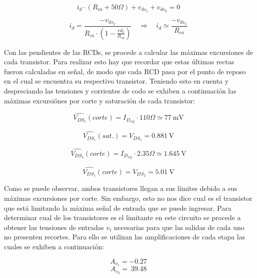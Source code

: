 \documentclass[a4paper,10pt]{article}
\begin{document}
				\begin{equation}
					i_d \cdot (R_{ca} + 50 \Omega) + v_{ds_1} + v_{ds_2} = 0  \label{eeq003}
				\end{equation}

				\begin{equation}
					i_d = \frac{- v_{ds_2}}{R_{ca} \cdot(1 - \frac{r{d_2}}{R_{ca}})} \quad \Rightarrow \quad i_d \simeq \frac{- v_{ds_2}}{R_{ca}}	\label{eeq004}
				\end{equation}	

				Con las pendientes de las RCDs, se procede a calcular las máximas excursiones de cada transistor. Para realizar esto hay que recordar que estas
				últimas rectas fueron calculadas en señal, de modo que cada RCD pasa por el punto de reposo en el cual se encuentra su respectivo transistor. 
				Teniendo esto en cuenta y despreciando las tensiones y corrientes de codo se exhiben a continuación las máximas excursiónes por corte y saturación 
				de cada transistor:

				\begin{equation*}
					\hat{V_{DS_1}}(corte) = I_{D_{1Q}} \cdot 110 \Omega \simeq 77~\text{mV}
				\end{equation*}

				\begin{equation*}
					\hat{V_{DS_1}}(sat.) = V_{DS_1} = 0.881~\text{V}
				\end{equation*}

				\begin{equation*}
					\hat{V_{DS_2}}(corte) = I_{D_{1Q}} \cdot 2.35 \Omega \simeq 1.645~\text{V}
				\end{equation*}
					
				\begin{equation*}
					\hat{V_{DS_1}}(corte) = V_{DS_2} = 5.01~\text{V}
				\end{equation*}

				Como se puede observar, ambos transistores llegan a sus límites debido a sus máximas excursiones por corte. Sin embargo, esto no nos dice cual es
				el transistor que está limitando la máxima señal de entrada que se puede ingresar. Para determinar cual de los transistores es el limitante en este 
				circuito se procede a obtener las tensiones de entradas $v_i$ necesarias para que las salidas de cada uno no presenten recortes. Para ello se utilizan 	
				las amplificaciones de cada etapa las cuales se exhiben a continuación:

				\begin{displaymath}
					A_{v_1}= -0.27
				\end{displaymath}
				\begin{displaymath}
					A_{v_2} =~39.48
				\end{displaymath}
\end{document}
